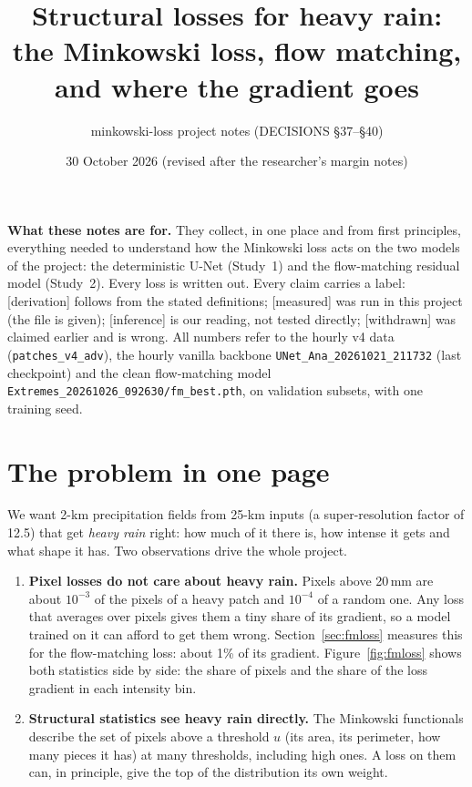\documentclass[11pt,a4paper]{article}
\title{Structural losses for heavy rain:\\ the Minkowski loss, flow matching, and where the gradient goes}
\author{minkowski-loss project notes \quad (DECISIONS \S37--\S40)}
\date{30 October 2026 (revised after the researcher's margin notes)}
\newcommand{\status}[1]{\textsf{\small[#1]}}
\begin{document}
\sloppy
\maketitle

\noindent\textbf{What these notes are for.} They collect, in one place and from first principles, everything needed to
understand how the Minkowski loss acts on the two models of the project: the deterministic U-Net (Study~1) and the
flow-matching residual model (Study~2). Every loss is written out. Every claim carries a label:
\status{derivation} follows from the stated definitions; \status{measured} was run in this project (the file is
given); \status{inference} is our reading, not tested directly; \status{withdrawn} was claimed earlier and is wrong.
All numbers refer to the hourly v4 data (\texttt{patches\_v4\_adv}), the hourly vanilla backbone
\texttt{UNet\_Ana\_20261021\_211732} (last checkpoint) and the clean flow-matching model
\texttt{Extremes\_20261026\_092630/fm\_best.pth}, on validation subsets, with one training seed.

\tableofcontents

\section{The problem in one page}

We want 2-km precipitation fields from 25-km inputs (a super-resolution factor of 12.5) that get \emph{heavy rain} right: how much of it there is, how
intense it gets and what shape it has. Two observations drive the whole project.

\begin{enumerate}[leftmargin=1.4em]
\item \textbf{Pixel losses do not care about heavy rain.} Pixels above 20\,mm are about $10^{-3}$ of the pixels of a
heavy patch and $10^{-4}$ of a random one. Any loss that averages over pixels gives them a tiny share of its
gradient, so a model trained on it can afford to get them wrong. Section~\ref{sec:fmloss} measures this for the
flow-matching loss: about 1\% of its gradient. Figure~\ref{fig:fmloss} shows both statistics side by side: the share of
pixels and the share of the loss gradient in each intensity bin.
\item \textbf{Structural statistics see heavy rain directly.} The Minkowski functionals describe the set of pixels
above a threshold $u$ (its area, its perimeter, how many pieces it has) at many thresholds, including high ones. A
loss on them can, in principle, give the top of the distribution its own weight.
\end{enumerate}
\end{document}
